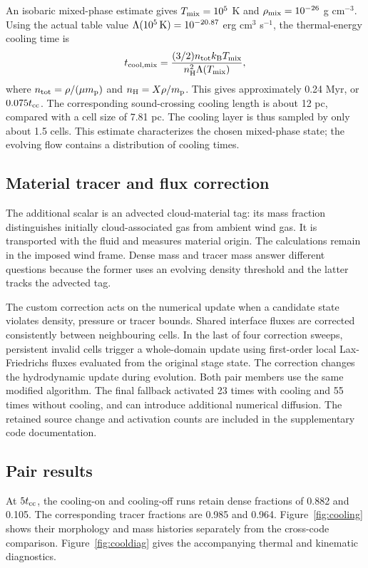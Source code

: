 \documentclass[twocolumn,apj,numberedappendix]{openjournal}
\begin{document}
An isobaric mixed-phase estimate gives $T_{\rm mix}=10^5$ K and $\rho_{\rm mix}=10^{-26}$ g cm$^{-3}$. Using the actual table value $\Lambda(10^5\,{\rm K})=10^{-20.87}$ erg cm$^3$ s$^{-1}$, the thermal-energy cooling time is
\begin{equation}
t_{\rm cool,mix}=\frac{(3/2)n_{\rm tot}k_{\rm B}T_{\rm mix}}{n_{\rm H}^2\Lambda(T_{\rm mix})},
\label{eq:tcool}
\end{equation}
where $n_{\rm tot}=\rho/(\mu m_{\rm p})$ and $n_{\rm H}=X\rho/m_{\rm p}$. This gives approximately 0.24 Myr, or $0.075t_{\rm cc}$. The corresponding sound-crossing cooling length is about 12 pc, compared with a cell size of 7.81 pc. The cooling layer is thus sampled by only about 1.5 cells. This estimate characterizes the chosen mixed-phase state; the evolving flow contains a distribution of cooling times.

\subsection{Material tracer and flux correction}
The additional scalar is an advected cloud-material tag: its mass fraction distinguishes initially cloud-associated gas from ambient wind gas. It is transported with the fluid and measures material origin. The calculations remain in the imposed wind frame. Dense mass and tracer mass answer different questions because the former uses an evolving density threshold and the latter tracks the advected tag.

The custom correction acts on the numerical update when a candidate state violates density, pressure or tracer bounds. Shared interface fluxes are corrected consistently between neighbouring cells. In the last of four correction sweeps, persistent invalid cells trigger a whole-domain update using first-order local Lax-Friedrichs fluxes evaluated from the original stage state. The correction changes the hydrodynamic update during evolution. Both pair members use the same modified algorithm. The final fallback activated 23 times with cooling and 55 times without cooling, and can introduce additional numerical diffusion. The retained source change and activation counts are included in the supplementary code documentation.

\subsection{Pair results}
At $5t_{\rm cc}$, the cooling-on and cooling-off runs retain dense fractions of 0.882 and 0.105. The corresponding tracer fractions are 0.985 and 0.964. Figure~\ref{fig:cooling} shows their morphology and mass histories separately from the cross-code comparison. Figure~\ref{fig:cooldiag} gives the accompanying thermal and kinematic diagnostics.
\end{document}
